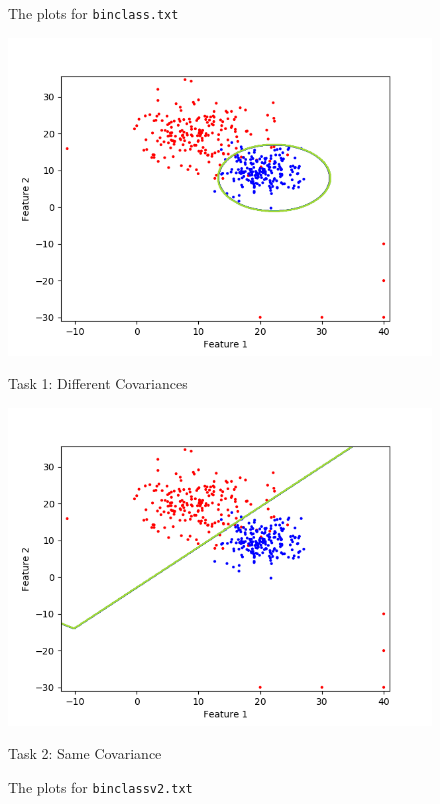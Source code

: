 \documentclass[a4paper,11pt]{article}
\begin{document}
\begin{mlsolution}
\begin{figure}[h]
        \caption{The plots for \texttt{binclass.txt}}
    \end{figure}
    \begin{figure}[h]
        \centering
        \begin{minipage}{0.5\textwidth}
            \centering
            \includegraphics[width=\textwidth]{Part2_Task1.png} %
            \caption*{Task 1: Different Covariances}
        \end{minipage}\hfill
        \begin{minipage}{0.5\textwidth}
            \centering
            \includegraphics[width=\textwidth]{Part2_Task2.png} %
            \caption*{Task 2: Same Covariance}
        \end{minipage}
        \caption{The plots for \texttt{binclassv2.txt}}
    \end{figure}


\end{mlsolution}
\end{document}
